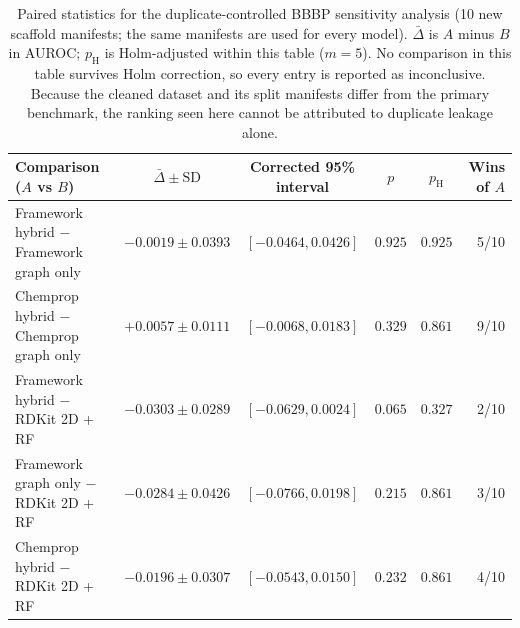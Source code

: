 \begin{table}[H]
\caption{Paired statistics for the duplicate-controlled BBBP sensitivity analysis (10 new scaffold manifests; the same manifests are used for every model). $\bar\Delta$ is $A$ minus $B$ in AUROC; $p_{\mathrm{H}}$ is Holm-adjusted within this table ($m=5$). No comparison in this table survives Holm correction, so every entry is reported as inconclusive. Because the cleaned dataset and its split manifests differ from the primary benchmark, the ranking seen here cannot be attributed to duplicate leakage alone.}\label{tab:bbbp-sensitivity-stats}
\centering\scriptsize
\setlength{\tabcolsep}{4pt}
\begin{tabular}{@{}lccccr@{}}
\toprule
Comparison ($A$ vs $B$) & $\bar\Delta\pm\mathrm{SD}$ & Corrected 95\% interval & $p$ & $p_{\mathrm{H}}$ & Wins of $A$ \\
\midrule
Framework hybrid $-$ Framework graph only & $-0.0019\pm0.0393$ & $[-0.0464,0.0426]$ & $0.925$ & $0.925$ & 5/10 \\
Chemprop hybrid $-$ Chemprop graph only & $+0.0057\pm0.0111$ & $[-0.0068,0.0183]$ & $0.329$ & $0.861$ & 9/10 \\
Framework hybrid $-$ RDKit 2D + RF & $-0.0303\pm0.0289$ & $[-0.0629,0.0024]$ & $0.065$ & $0.327$ & 2/10 \\
Framework graph only $-$ RDKit 2D + RF & $-0.0284\pm0.0426$ & $[-0.0766,0.0198]$ & $0.215$ & $0.861$ & 3/10 \\
Chemprop hybrid $-$ RDKit 2D + RF & $-0.0196\pm0.0307$ & $[-0.0543,0.0150]$ & $0.232$ & $0.861$ & 4/10 \\
\bottomrule
\end{tabular}
\end{table}
